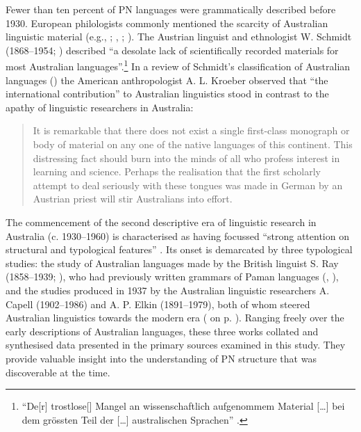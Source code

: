 Fewer than ten percent of PN languages were grammatically described before 1930. European philologists commonly mentioned the scarcity of Australian linguistic material (e.g., \citealt[489]{gabelentz_uber_1861}; \citealt[241]{muller_reise_1867}, \citeyear[2]{muller_grundris_1882}; \citealt[403]{gabelentz_sprachwissenschaft_1891}). The Austrian linguist and ethnologist W. Schmidt (1868--1954; \citeyear[941]{schmidt_review_1946}) described “a desolate lack of scientifically recorded materials for most Australian languages”.\footnote{ “De[r] trostlose[] Mangel an wissenschaftlich aufgenommem Material […] bei dem grössten Teil der […] australischen Sprachen” \citep[941]{schmidt_review_1946}.} In a review of Schmidt’s classification of Australian languages (\citeyear{schmidt_personalpronomina_1919}) the American anthropologist A. L. Kroeber observed that ``the international contribution'' to Australian linguistics stood in contrast to the apathy of linguistic researchers in Australia:

\begin{quote}
    It is remarkable that there does not exist a single first-class monograph or body of material on any one of the native languages of this continent. This distressing fact should burn into the minds of all who profess interest in learning and science. Perhaps the realisation that the first scholarly attempt to deal seriously with these tongues was made in German by an Austrian priest will stir Australians into effort. \citep[226]{kroeber_australian_1921}
\end{quote}

The commencement of the second descriptive era of linguistic research in Australia (c. 1930--1960) is characterised as having focussed “strong attention on structural and typological features” \citep[17]{wurm_languages_1972}. Its onset is demarcated by three typological studies: the study of Australian languages made by the British linguist S. Ray (1858--1939; \citeyear{ray_aboriginal_1925}), who had previously written grammars of Paman languages (\citeyear{ray_study_1893}, \citeyear{ray_linguistics_1907}), and the studies produced in 1937 by the Australian linguistic researchers A. Capell (1902--1986) and A. P. Elkin (1891--1979), both of whom steered Australian linguistics towards the modern era ( on p. \pageref{tab:chap1:early}). Ranging freely over the early descriptions of Australian languages, these three works collated and synthesised data presented in the primary sources examined in this study. They provide valuable insight into the understanding of PN structure that was discoverable at the time.

